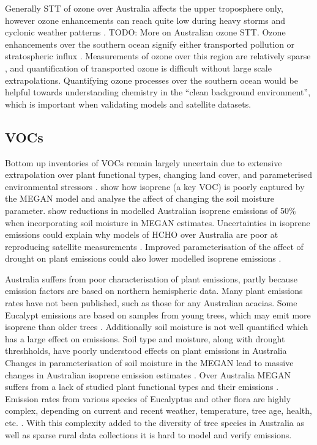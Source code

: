     Generally STT of ozone over Australia affects the upper troposphere only, however ozone enhancements can reach quite low during heavy storms and cyclonic weather patterns \parencite{Alexander2013}.
    TODO: More on Australian ozone STT.
    Ozone enhancements over the southern ocean signify either transported pollution or stratospheric influx \parencite{Jacobson2000}.
    Measurements of ozone over this region are relatively sparse \parencite{Skerlak2014}, and quantification of transported ozone is difficult without large scale extrapolations.
    Quantifying ozone processes over the southern ocean would be helpful towards understanding chemistry in the ``clean background environment'', which is important when validating models and satellite datasets.
  
  \subsection{VOCs}
    
    Bottom up inventories of VOCs remain largely uncertain due to extensive extrapolation over plant functional types, changing land cover, and parameterised environmental stressors \parencite{Guenther2000,Kanakidou2005,Millet2006}.
    \textcite{Muller2008} show how isoprene (a key VOC) is poorly captured by the MEGAN model and analyse the affect of changing the soil moisture parameter.
    \textcite{Sindelarova2014} show reductions in modelled Australian isoprene emissions of 50\% when incorporating soil moisture in MEGAN estimates. 
    Uncertainties in isoprene emissions could explain why models of HCHO over Australia are poor at reproducing satellite measurements \parencite{Stavrakou2009}.
    Improved parameterisation of the affect of drought on plant emissions could also lower modelled isoprene emissions \parencite{Jiang2018}.
    
    
    Australia suffers from poor characterisation of plant emissions, partly because emission factors are based on northern hemispheric data.
    Many plant emissions rates have not been published, such as those for any Australian acacias.
    Some Eucalypt emissions are based on samples from young trees, which may emit more isoprene than older trees \parencite{Emmerson2016}.
    Additionally soil moisture is not well quantified which has a large effect on emissions.
    Soil type and moisture, along with drought threshholds, have poorly understood effects on plant emissions in Australia
    Changes in parameterisation of soil moisture in the MEGAN lead to massive changes in Australian isoprene emission estimates \parencite{Sindelarova2014}.
    Over Australia MEGAN suffers from a lack of studied plant functional types and their emissions \parencite[eg.][]{Muller2008}.
    Emission rates from various species of Eucalyptus and other flora are highly complex, depending on current and recent weather, temperature, tree age, health, etc. \parencite{Guenther2012}. 
    With this complexity added to the diversity of tree species in Australia as well as sparse rural data collections it is hard to model and verify emissions.
       
